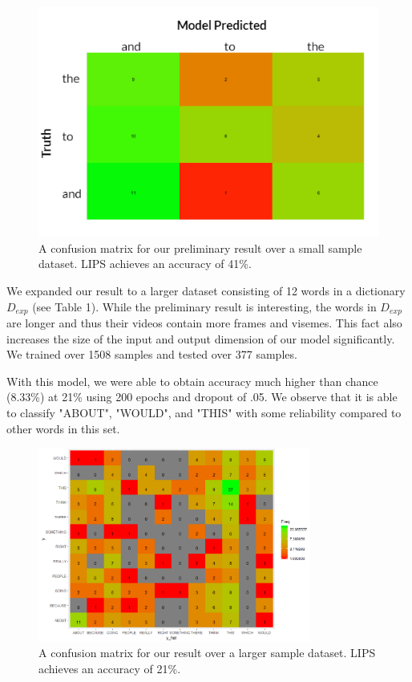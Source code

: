 \documentclass{article}
\begin{document}
   \begin{figure}[h!]
 \centering
  \includegraphics{result1}
 \caption{A confusion matrix for our preliminary result over a small sample dataset. LIPS achieves an accuracy of 41\%.}
 \end{figure}

We expanded our result to a larger dataset consisting of 12 words in a dictionary $D_{exp}$ (see Table 1). While the preliminary result is interesting, the words in $D_{exp}$ are longer and thus their videos contain more frames and visemes. This fact also increases the size of the input and output dimension of our model significantly. We trained over 1508 samples and tested over 377 samples.

With this model, we were able to obtain accuracy much higher than chance (8.33\%) at 21\% using 200 epochs and dropout of .05. We observe that it is able to classify "ABOUT", "WOULD", and "THIS" with some reliability compared to other words in this set.

   \begin{figure}[h!]
 \centering
  \includegraphics[width=0.8\textwidth]{result2}
 \caption{A confusion matrix for our result over a larger sample dataset. LIPS achieves an accuracy of 21\%.}
 \end{figure}
\end{document}
